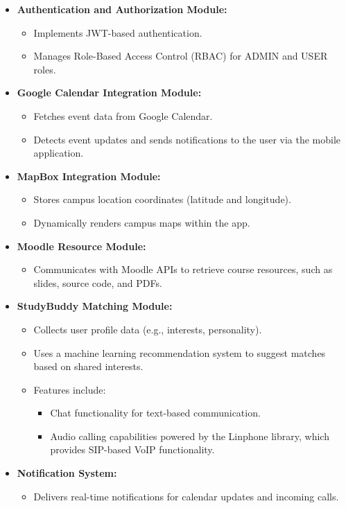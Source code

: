 \documentclass{article}
\begin{document}
\begin{itemize}  
    \item \textbf{Authentication and Authorization Module:}  
    \begin{itemize}  
        \item Implements JWT-based authentication.  
        \item Manages Role-Based Access Control (RBAC) for ADMIN and USER roles.  
    \end{itemize}  

    \item \textbf{Google Calendar Integration Module:}  
    \begin{itemize}  
        \item Fetches event data from Google Calendar.  
        \item Detects event updates and sends notifications to the user via the mobile application.  
    \end{itemize}  

    \item \textbf{MapBox Integration Module:}  
    \begin{itemize}  
        \item Stores campus location coordinates (latitude and longitude).  
        \item Dynamically renders campus maps within the app.  
    \end{itemize}  

    \item \textbf{Moodle Resource Module:}  
    \begin{itemize}  
        \item Communicates with Moodle APIs to retrieve course resources, such as slides, source code, and PDFs.  
    \end{itemize}  

    \item \textbf{StudyBuddy Matching Module:}  
    \begin{itemize}  
        \item Collects user profile data (e.g., interests, personality).  
        \item Uses a machine learning recommendation system to suggest matches based on shared interests.  
        \item Features include:  
        \begin{itemize}  
            \item Chat functionality for text-based communication.  
            \item Audio calling capabilities powered by the Linphone library, which provides SIP-based VoIP functionality.  
        \end{itemize}  
    \end{itemize}  

    \item \textbf{Notification System:}  
    \begin{itemize}  
        \item Delivers real-time notifications for calendar updates and incoming calls.  
    \end{itemize}  
\end{itemize}
\end{document}
